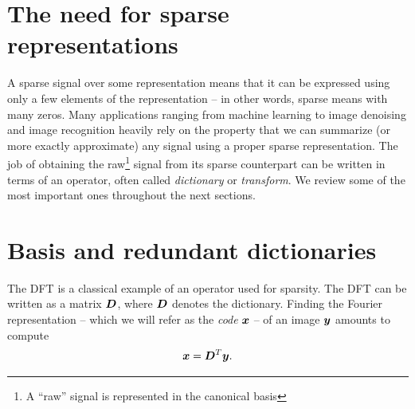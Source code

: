 \section{The need for sparse representations}

A sparse signal over some representation means that it can be expressed using only a few elements of the representation – in other words, sparse means with many zeros. Many applications ranging from machine learning to image denoising and image recognition heavily rely on the property that we can summarize (or more exactly approximate) any signal using a proper sparse representation. The job of obtaining the raw\footnote{A “raw” signal is represented in the canonical basis} signal from its sparse counterpart can be written in terms of an operator, often called \emph{dictionary} or \emph{transform}. We review some of the most important ones throughout the next sections.

\section{Basis and redundant dictionaries}

The \ac{DFT} is a classical example of an operator used for sparsity. The \ac{DFT} can be written as a matrix $\bm{D}$, where $\bm{D}$ denotes the dictionary. Finding the Fourier representation – which we will refer as the \emph{code} $\bm{x}$ – of an image $\bm{y}$ amounts to compute 
\begin{equation*}\bm{x} = \bm{D}^T\bm{y}.\end{equation*}

